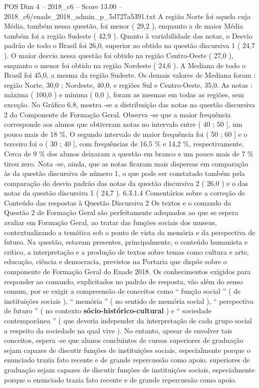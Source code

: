 \begin{textsample}{POS Dim 4 – 2018\_c6 – Score 13.00 – 2018\_c6/enade\_2018\_admin\_p\_5d727a5391.txt}
A região Norte foi aquela cuja Média, também nessa questão, foi menor ( 29,2 ), enquanto a de maior Média também foi a região Sudeste ( 42,9 ).
Quanto à variabilidade das notas, o Desvio padrão de todo o Brasil foi 26,0, superior ao obtido na questão discursiva 1 ( 24,7 ).
O maior desvio nessa questão foi obtido na região Centro-Oeste ( 27,0 ), enquanto o menor foi obtido na região Nordeste ( 24,6 ).
A Mediana de todo o Brasil foi 45,0, a mesma da região Sudeste.
Os demais valores de Mediana foram : região Norte, 30,0 ; Nordeste, 40,0, e regiões Sul e Centro-Oeste, 35,0.
As notas : máxima ( 100,0 ) e mínima ( 0,0 ), foram as mesmas em todas as regiões, sem exceção.
No Gráfico 6.8, mostra -se a distribuição das notas na questão discursiva 2 do Componente de Formação Geral.
Observa -se que a maior frequência corresponde aos alunos que obtiveram notas no intervalo entre ( 40 ; 50 ], um pouco mais de 18 \%.
O segundo intervalo de maior frequência foi ( 50 ; 60 ] e o terceiro foi o ( 30 ; 40 ], com frequências de 16,5 \% e 14,2 \%, respectivamente.
Cerca de 9 \% dos alunos deixaram a questão em branco e um pouco mais de 7 \% tirou zero.
Nota -se, ainda, que as notas ficaram mais dispersas em comparação às da questão discursiva de número 1, o que pode ser constatado também pela comparação do desvio padrão das notas da questão discursiva 2 ( 26,0 ) e o das notas da questão discursiva 1 ( 24,7 ). 6.3.1.4 Comentários sobre a correção de Conteúdo das respostas à Questão Discursiva 2 Os textos e o comando da Questão 2 de Formação Geral são perfeitamente adequados ao que se espera avaliar em Formação Geral, ao tratar das funções sociais dos museus, contextualizando a temática sob o ponto de vista da memória e da perspectiva de futuro.
Na questão, estavam presentes, principalmente, o conteúdo humanista e crítico, a interpretação e a produção de textos sobre temas como cultura e arte, educação, ciência e democracia, previstos na Portaria que dispõe sobre o componente de Formação Geral do Enade 2018.
Os conhecimentos exigidos para responder ao comando, explicitados no padrão de resposta, vão além do senso comum, por se exigir a compreensão de conceitos como “ função social ” ( de instituições sociais ), “ memória ” ( no sentido de memória social ), “ perspectiva de futuro ” ( no contexto \textbf{sócio-histórico-cultural} ) e “ sociedade contemporânea ” ( que deveria independer da interpretação de cada grupo social a respeito da sociedade na qual vive ).
No entanto, apesar de envolver tais conceitos, espera -se que alunos concluintes de cursos superiores de graduação sejam capazes de discutir funções de instituições sociais, especialmente porque o enunciado trazia fato recente e de grande repercussão como apoio. superiores de graduação sejam capazes de discutir funções de instituições sociais, especialmente porque o enunciado trazia fato recente e de grande repercussão como apoio.

\end{textsample}
